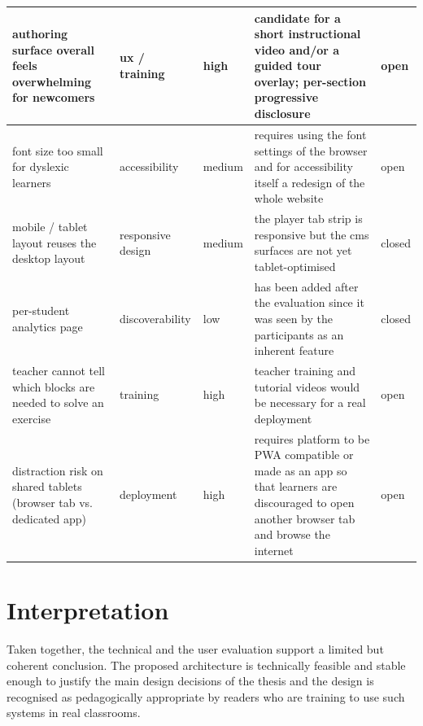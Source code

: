 \begin{table}
\begin{tabularx}{\textwidth}{|X|l|l|X|X|}
    authoring surface overall feels overwhelming for newcomers          & ux / training           & high            & candidate for a short instructional video and/or a guided tour overlay; per-section progressive disclosure                                    & open            \\\hline
    font size too small for dyslexic learners                           & accessibility           & medium          & requires using the font settings of the browser and for accessibility itself a redesign of the whole website                                  & open            \\\hline
    mobile / tablet layout reuses the desktop layout                    & responsive design       & medium          & the player tab strip is responsive but the cms surfaces are not yet tablet-optimised                                                          & closed          \\\hline
    per-student analytics page                                          & discoverability         & low             & has been added after the evaluation since it was seen by the participants as an inherent feature                                              & closed          \\\hline
    teacher cannot tell which blocks are needed to solve an exercise    & training                & high            & teacher training and tutorial videos would be necessary for a real deployment                                                                & open            \\\hline
    distraction risk on shared tablets (browser tab vs. dedicated app)  & deployment              & high            & requires platform to be PWA compatible or made as an app so that learners are discouraged to open another browser tab and browse the internet & open            \\\hline
  \end{tabularx}
\end{table}


\section{Interpretation}
Taken together, the technical and the user evaluation support a limited but coherent conclusion.
The proposed architecture is technically feasible and stable enough to justify the main design decisions of the thesis
and the design is recognised as pedagogically appropriate by readers who are training to use
such systems in real classrooms.

